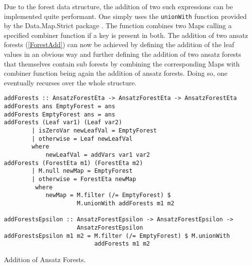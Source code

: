 Due to the forest data structure, the addition of two such expressions can be implemented quite performant. One simply uses the \texttt{unionWith} function provided by the Data.Map.Strict package \cite{HackageMap}. The function combines two Maps calling a specified combiner function if a key is present in both. The addition of two ansatz forests (\ref{ForestAdd}) can now be achieved by defining the addition of the leaf values in an obvious way and further defining the addition of two ansatz forests that themselves contain sub forests by combining the corresponding Maps with combiner function being again the addition of ansatz forests. Doing so, one eventually recurses over the whole structure. 
\begin{listing}[hbt!] 
\begin{verbatim}
addForests :: AnsatzForestEta -> AnsatzForestEta -> AnsatzForestEta
addForests ans EmptyForest = ans
addForests EmptyForest ans = ans
addForests (Leaf var1) (Leaf var2)
        | isZeroVar newLeafVal = EmptyForest
        | otherwise = Leaf newLeafVal
        where
            newLeafVal = addVars var1 var2
addForests (ForestEta m1) (ForestEta m2)
        | M.null newMap = EmptyForest
        | otherwise = ForestEta newMap
         where
            newMap = M.filter (/= EmptyForest) $
                     M.unionWith addForests m1 m2

addForestsEpsilon :: AnsatzForestEpsilon -> AnsatzForestEpsilon ->
                     AnsatzForestEpsilon
addForestsEpsilon m1 m2 = M.filter (/= EmptyForest) $ M.unionWith
                          addForests m1 m2
\end{verbatim} 
\caption{Addition of Ansatz Forests.}\label{ForestAdd}
\end{listing}\\

